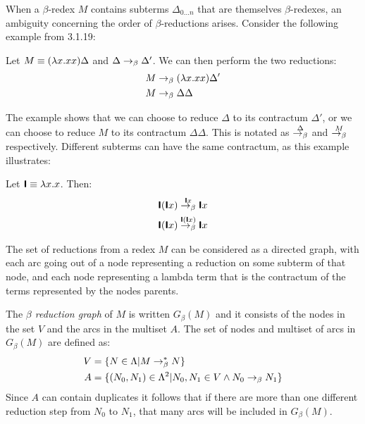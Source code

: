 When a $\beta$-redex $M$ contains subterms $\Delta_{0\hdots n}$ that are themselves 
$\beta$-redexes, an ambiguity concerning the order of $\beta$-reductions arises.
Consider the following example from \cite{Barendregt} 3.1.19:
\begin{example}
	Let $M\equiv(\lambda x.xx)\Delta$ and $\Delta\rightarrow_\beta\Delta'$. We can then perform the two reductions:
\begin{align*}
	M&\rightarrow_\beta(\lambda x.xx)\Delta' \\
	M&\rightarrow_\beta\Delta\Delta
\end{align*}
\end{example}
The example shows that we can choose to reduce $\Delta$ to its contractum $\Delta'$, or
we can choose to reduce $M$ to its contractum $\Delta\Delta$. This is notated as 
$\overset{\Delta}{\rightarrow_\beta}$ and $\overset{M}{\rightarrow_\beta}$ respectively. Different
subterms can have the same contractum, as this example illustrates:
\begin{example}
	Let $\textsf{\textbf{I}}\equiv\lambda x.x$. Then:
\begin{align*}
	\textsf{\textbf{I}}(\textsf{\textbf{I}} x)&\overset{\textsf{\textbf{I}} x}{\rightarrow_\beta}\textsf{\textbf{I}} x \\
	\textsf{\textbf{I}}(\textsf{\textbf{I}} x)&\overset{\textsf{\textbf{I}}(\textsf{\textbf{I}} x)}{\rightarrow_\beta}\textsf{\textbf{I}} x
\end{align*}
\end{example}
The set of reductions from a redex $M$ can
be considered as a directed graph, with each arc going out of a node representing
a reduction on some subterm of that node, and each node representing a lambda term that
is the contractum of the terms represented by the nodes parents.
\begin{definition}
	The \emph{$\beta$ reduction graph} of $M$ is written $G_\beta(M)$ and it consists
	of the nodes in the set $V$ and the arcs in the multiset $A$. The set
	of nodes and multiset of arcs in $G_\beta(M)$ are defined as:
\begin{align*}
	V&=\{N\in\Lambda|M\rightarrow_\beta^* N\} \\
	A&=\{(N_0, N_1)\in\Lambda^2|N_0,N_1\in V\wedge N_0\rightarrow_\beta N_1\}
\end{align*}
	Since $A$ can contain duplicates it follows that if there are more than one
	different reduction step from $N_0$ to $N_1$, that many arcs will be included 
	in $G_\beta(M)$.
\end{definition}
